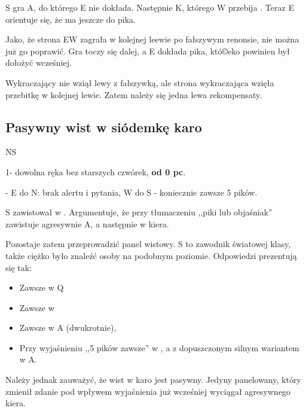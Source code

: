 \documentclass[12pt, a4paper]{article}
\newcounter{board}
\newcommand\nextboard{\stepcounter{board}\theboard}
\begin{document}
S gra \xspades A, do którego E nie dokłada. Następnie \xspades K, którego W przebija .
Teraz E orientuje się, że ma jeszcze do pika.

Jako, że strona EW zagrała w kolejnej leewie po fałszywym renonsie, 
nie można już go poprawić. Gra toczy się dalej, a E dokłada pika, któ©eko powinien był
dołożyć wcześniej.

Wykraczający nie wziął lewy z fałszywką, ale strona wykraczająca wzięła
przebitkę w kolejnej lewie. Zatem należy się jedna lewa rekompensaty.


\subsection*{Pasywny wist w siódemkę karo}

\handdiagramv[\nextboard]{\vhand{752}{J9}{KJT532}{98}}
				{}
                {}
                {}{NS}


1\spades - dowolna ręka bez starszych czwórek, \textbf{od 0 pc}.

\dbl - E do N: brak alertu i pytania, W do S - koniecznie zawsze 5 pików.

S zawistował w . Argumentuje, że przy tłumaczeniu 
,,piki lub objaśniak'' zawistuje agresywnie \xspades A, a następnie w kiera.

Pozostaje zatem przeprowadzić panel wistowy. S to zawodnik światowej klasy,
także ciężko było znaleźć osoby na podobnym poziomie.
Odpowiedzi prezentują się tak:

\begin{itemize}
    \item Zawsze w \xhearts Q
    \item Zawsze w 
    \item Zawsze w \xspades A (dwukrotnie),
    \item Przy wyjaśnieniu ,,5 pików zawsze'' w , 
    a z dopuszczonym silnym wariantem w \xspades A.
\end{itemize}

Należy jednak zauważyć, że wist w karo jest pasywny. Jedyny panelowany,
który zmienił zdanie pod wpływem wyjaśnienia już wcześniej 
wyciągał agresywnego kiera. 
\end{document}
